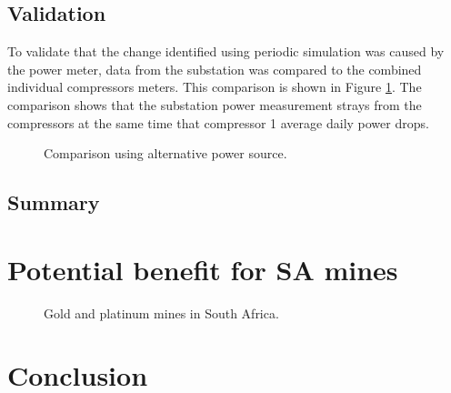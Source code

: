    \subsection{Validation}
To validate that the change identified using periodic simulation was caused by the power meter, data from the substation was compared to the combined individual compressors meters. This comparison is shown in Figure \ref{fig: Corrected Periodic simulation}. The comparison shows that the substation power measurement strays from the compressors at the same time that compressor 1 average daily power drops.
	\begin{figure}[h]
		\centering
		
		\caption{Comparison using alternative power source.}
		\label{fig: Corrected Periodic simulation}
	\end{figure}    
	
	\subsection{Summary}
\newpage
\section{Potential benefit for SA mines}
	\begin{figure}[h]
		\centering
		\caption{Gold and platinum mines in South Africa.}
		\label{fig: Mine map}
	\end{figure}
\section{Conclusion}